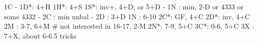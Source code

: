 1C - 
1D*: 4+H
1H*: 4+S
1S*: inv+, 4+D; or 5+D
   - 1N : min, 2-D or 4333 or some 4332
   - 2C : min unbal
   - 2D : 3+D
1N : 6-10
2C*: GF, 4+C
2D*: inv, 4+C
2M : 3-7, 6+M  # not interested in 16-17, 2-M
2N*: 7-9, 5+C
3C*: 0-6, 5+C
3X : 7+X, about 6-6.5 tricks
